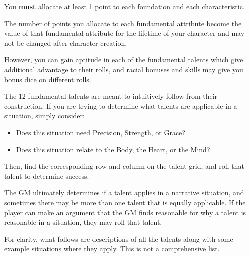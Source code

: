 You \textbf{must} allocate at least 1 point to each foundation and each characteristic.

The number of points you allocate to each fundamental attribute become the value of that fundamental attribute for the lifetime of your character and may not be changed after character creation.

However, you can gain aptitude in each of the fundamental talents which give additional advantage to their rolls, and racial bonuses and skills may give you bonus dice on different rolls.

The 12 fundamental talents are meant to intuitively follow from their construction. If you are trying to determine what talents are applicable in a situation, simply consider:
\begin{itemize}
	\item Does this situation need Precision, Strength, or Grace?
	\item Does this situation relate to the Body, the Heart, or the Mind?
\end{itemize}
Then, find the corresponding row and column on the talent grid, and roll that talent to determine success.

The GM ultimately determines if a talent applies in a narrative situation, and sometimes there may be more than one talent that is equally applicable. If the player can make an argument that the GM finds reasonable for why a talent is reasonable in a situation, they may roll that talent.

For clarity, what follows are descriptions of all the talents along with some example situations where they apply. This is not a comprehensive list.

